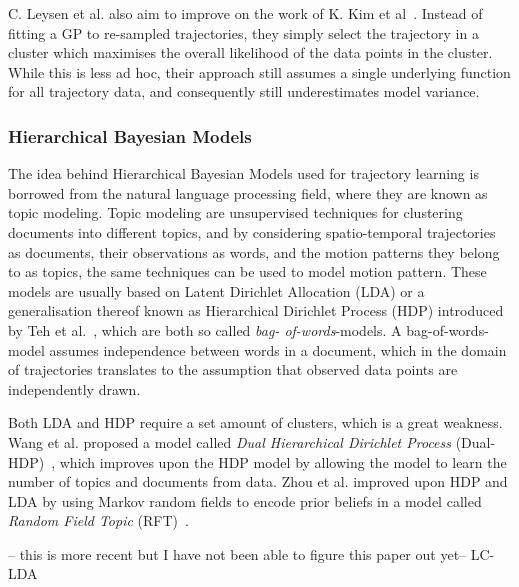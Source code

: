 C. Leysen et al. also aim to improve on the work of K. Kim et
al~\cite{Leysen2016Sep}. Instead of fitting a GP to re-sampled trajectories, 
they simply select the trajectory in a cluster which maximises the overall
likelihood of the data points in the cluster. While this is less
ad hoc, their approach still assumes a single underlying function for
all trajectory data, and consequently still underestimates model variance.

\subsubsection{Hierarchical Bayesian Models}
The idea behind Hierarchical Bayesian Models used for trajectory
learning is borrowed from the natural language processing field, where
they are known as topic modeling. Topic modeling are unsupervised
techniques for clustering documents into different topics, and by 
considering spatio-temporal trajectories as documents,
their observations as words, and the motion patterns they belong to as
topics, the same techniques can be used to model motion pattern.  
These models are usually based on Latent Dirichlet Allocation (LDA) or
a generalisation thereof known as Hierarchical Dirichlet Process (HDP)
introduced by Teh et al.~\cite{teh2005sharing}, which are both so called \textit{bag-
of-words}-models. A bag-of-words-model assumes independence between
words in a document, which in the domain of trajectories translates to the
assumption that observed data points are independently drawn.

Both LDA and HDP require a set amount of clusters, which is a great
weakness. Wang et al. proposed a model called \textit{Dual Hierarchical Dirichlet
Process} (Dual-HDP)~\cite{Wang2008Jun}, which improves upon the HDP model
by allowing the model to learn the number of topics and documents from
data. Zhou et al. improved upon HDP and LDA by using Markov random
fields to encode prior beliefs in a model called \textit{Random Field
  Topic} (RFT)~\cite{Zhou2011Jun}.

-- this is more recent but I have not been able to figure this paper out yet--
LC-LDA~\cite{Zou2016Apr}





